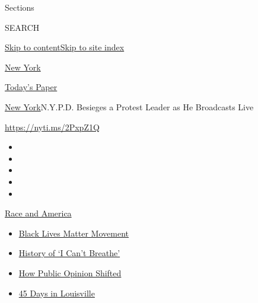 Sections

SEARCH

\protect\hyperlink{site-content}{Skip to
content}\protect\hyperlink{site-index}{Skip to site index}

\href{https://www.nytimes3xbfgragh.onion/section/nyregion}{New York}

\href{https://myaccount.nytimes3xbfgragh.onion/auth/login?response_type=cookie\&client_id=vi}{}

\href{https://www.nytimes3xbfgragh.onion/section/todayspaper}{Today's
Paper}

\href{/section/nyregion}{New York}\textbar{}N.Y.P.D. Besieges a Protest
Leader as He Broadcasts Live

\url{https://nyti.ms/2PxpZ1Q}

\begin{itemize}
\item
\item
\item
\item
\item
\end{itemize}

\href{https://www.nytimes3xbfgragh.onion/news-event/george-floyd-protests-minneapolis-new-york-los-angeles?action=click\&pgtype=Article\&state=default\&region=TOP_BANNER\&context=storylines_menu}{Race
and America}

\begin{itemize}
\tightlist
\item
  \href{https://www.nytimes3xbfgragh.onion/interactive/2020/07/03/us/george-floyd-protests-crowd-size.html?action=click\&pgtype=Article\&state=default\&region=TOP_BANNER\&context=storylines_menu}{Black
  Lives Matter Movement}
\item
  \href{https://www.nytimes3xbfgragh.onion/interactive/2020/06/28/us/i-cant-breathe-police-arrest.html?action=click\&pgtype=Article\&state=default\&region=TOP_BANNER\&context=storylines_menu}{History
  of `I Can't Breathe'}
\item
  \href{https://www.nytimes3xbfgragh.onion/interactive/2020/06/10/upshot/black-lives-matter-attitudes.html?action=click\&pgtype=Article\&state=default\&region=TOP_BANNER\&context=storylines_menu}{How
  Public Opinion Shifted}
\item
  \href{https://www.nytimes3xbfgragh.onion/interactive/2020/07/16/us/black-lives-matter-protests-louisville-breonna-taylor.html?action=click\&pgtype=Article\&state=default\&region=TOP_BANNER\&context=storylines_menu}{45
  Days in Louisville}
\end{itemize}

